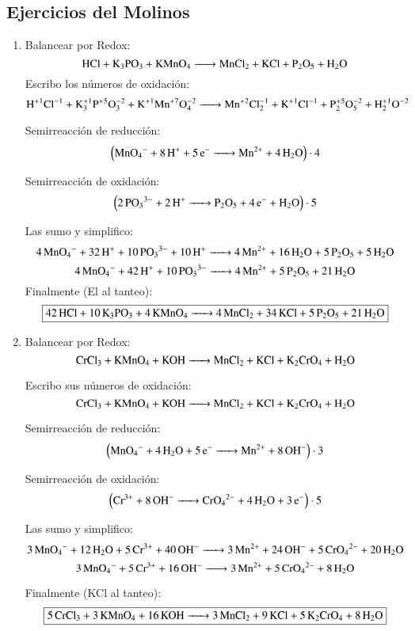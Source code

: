 \subsection{Ejercicios del Molinos}

\begin{enumerate}
\item Balancear por Redox:
$$\ce{
HCl + K3PO3 + KMnO4 ->
MnCl2 + KCl + P2O5 + H2O
}$$
Escribo los números de oxidación:
$$\ce{
H^{+1}Cl^{-1} + K^{+1}3P^{+5}O^{-2}3 + K^{+1}Mn^{+7}O^{-2}4 ->
Mn^{+2}Cl^{-1}2 + K^{+1}Cl^{-1} + P^{+5}2O^{-2}5 + H^{+1}2O^{-2}
}$$


\begin{multicols}{2}
    Semirreacción de reducción:
    $$\left(\ce{
    MnO4^- + 8H^+ + 5e^- ->
    Mn^{2+} + 4H2O
    }\right) \cdot 4$$
    
    Semirreacción de oxidación:
    $$\left(\ce{
    2PO3^{3-} + 2H^+ ->
    P2O5 + 4e^- + H2O
    }\right) \cdot 5$$
\end{multicols}

Las sumo y simplifico:
$$\ce{
4MnO4^- + 32H^+ + 10 PO3^{3-} + 10H^+ ->
4Mn^{2+} + 16H2O + 5P2O5 + 5H2O
}$$
$$\ce{
4MnO4^- + 42H^+ + 10 PO3^{3-} ->
4Mn^{2+} + 5P2O5 + 21H2O
}$$
Finalmente (El  al tanteo):
$$\fbox{\ce{
42HCl + 10K3PO3 + 4KMnO4 ->
4MnCl2 + 34KCl + 5P2O5 + 21H2O
}}$$


\item Balancear por Redox:
$$\ce{
CrCl3 + KMnO4 + KOH ->
MnCl2 + KCl + K2CrO4 + H2O
}$$

Escribo sus números de oxidación:
$$\ce{
CrCl3 + KMnO4 + KOH ->
MnCl2 + KCl + K2CrO4 + H2O
}$$


\begin{multicols}{2}
Semirreacción de reducción:
$$\left(\ce{
MnO4^- + 4H2O + 5e^- ->
Mn^{2+} + 8 OH^{-}
}\right) \cdot 3$$

Semirreacción de oxidación:
$$\left(\ce{
Cr^{3+} + 8OH^- ->
CrO4^{2-} + 4H2O + 3e^-
}\right) \cdot 5$$
\end{multicols}

Las sumo y simplifico:
$$\ce{
3MnO4^- + 12H2O + 5Cr^{3+} + 40OH^- ->
3Mn^{2+} + 24 OH^{-} + 5CrO4^{2-} + 20H2O
}$$
$$\ce{
3MnO4^- + 5Cr^{3+} + 16OH^- ->
3Mn^{2+} + 5CrO4^{2-} + 8H2O
}$$

Finalmente (KCl al tanteo):
$$\fbox{\ce{
5CrCl3 + 3KMnO4 + 16KOH ->
3MnCl2 + 9KCl + 5K2CrO4 + 8H2O
}}$$
\end{enumerate}